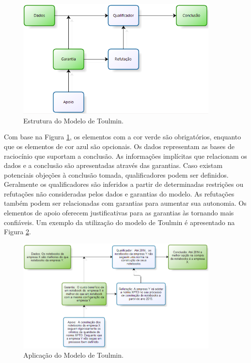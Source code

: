 \graphicspath{{figuras/}}
\begin{figure}[H]
\centering
\includegraphics[width=0.9\textwidth]{elementos_modelo_toulmin}
\caption{Estrutura do Modelo de Toulmin.}
\label{elementos_modelo_toulmin}
\end{figure}

Com base na Figura \ref{elementos_modelo_toulmin}, os elementos com a cor verde são obrigatórios, enquanto que os elementos de cor azul são opcionais. Os dados representam as bases de raciocínio que suportam a conclusão. As informações implícitas que relacionam os dados e a conclusão são apresentadas através das garantias. Caso existam potenciais objeções à conclusão tomada, qualificadores podem ser definidos. Geralmente os qualificadores são inferidos a partir de determinadas restrições ou refutações não consideradas pelos dados e garantias do modelo. As refutações também podem ser relacionadas com garantias para aumentar sua autonomia. Os elementos de apoio oferecem justificativas para as garantias às tornando mais confiáveis.   Um exemplo da utilização do modelo de Toulmin é apresentado na Figura \ref{aplicacao_modelo_toulmin}.

\graphicspath{{figuras/}}
\begin{figure}[H]
\centering
\includegraphics[width=0.9\textwidth]{aplicacao_modelo_toulmin}
\caption{Aplicação do Modelo de Toulmin.}
\label{aplicacao_modelo_toulmin}
\end{figure}


